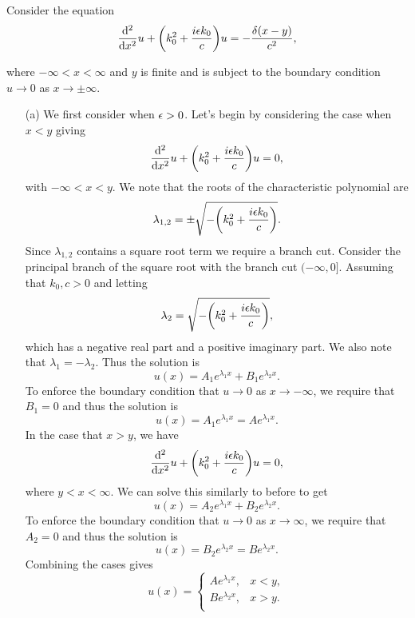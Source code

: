 \documentclass[12pt]{report}
\begin{document}
\begin{solution}

    \noindent
    Consider the equation
    \begin{equation}\label{3}
        \frac{\mathrm{d}^{2} }{\mathrm{d} x^{2}}u + {\left(k_0^2 + \frac{i{\epsilon} k_0}{c}\right)}u = -\frac{\delta(x -y)}{c^2},
    \end{equation}
    
    where $-\infty < x < \infty$ and $y$ is finite and is subject to the boundary condition $u \to 0$ as $x \to \pm \infty$.

    \begin{enumerate}
        \item [(a)]
        We first consider  when ${\epsilon} > 0$. Let's begin by considering the case when $x < y$ giving 
        \[
            \frac{\mathrm{d}^{2} }{\mathrm{d} x^{2}}u + {\left(k_0^2 + \frac{i{\epsilon} k_0}{c}\right)}u = 0,
        \]      
        with $-\infty < x < y$. We note that the roots of the characteristic polynomial are
        \[
            \lambda_{1,2} = \pm \sqrt{-{\left(k_0^2 + \frac{i {\epsilon} k_0}{c}\right)}}.
        \]
        Since $\lambda_{1,2}$ contains a square root term we require a branch cut. Consider the principal branch of the square root with the branch cut $(-\infty,0]$.
        Assuming that $k_0, c> 0$ and letting
        \[
            \lambda_2 = \sqrt{-{\left(k_0^2 + \frac{i {\epsilon} k_0}{c}\right)}},
        \]
        which has a negative real part and a positive imaginary part. We also note that $\lambda_1 = -\lambda_2$. Thus the solution is
        \[
            u(x) = A_1 e^{\lambda_1 x} + B_1 e^{\lambda_2 x}.
        \] 
        To enforce the boundary condition that $u \to 0$ as $x \to -\infty$, we require that $B_1 = 0$ and thus the solution is
        \[
            u(x) = A_1 e^{\lambda_1 x} = A e^{\lambda_1 x}.
        \]
        In the case that $x > y$, we have 
        \[
            \frac{\mathrm{d}^{2} }{\mathrm{d} x^{2}}u + {\left(k_0^2 + \frac{i{\epsilon} k_0}{c}\right)}u = 0,
        \]
        where $y < x < \infty$. We can solve this similarly to before to get
        \[
            u(x) = A_2 e^{\lambda_1 x} + B_2 e^{\lambda_2 x}.
        \] 
        To enforce the boundary condition that $u \to 0$ as $x \to \infty$, we require that $A_2 = 0$ and thus the solution is
        \[
            u(x) = B_2e^{\lambda_2 x} = Be^{\lambda_2 x}.
        \]
        Combining the cases gives 
        \begin{equation}\label{3-intso}
            u(x) = \begin{cases}
                A e^{\lambda_1 x}, & x<y,\\
                B e^{\lambda_2 x}, & x>y.\\
            \end{cases}
        \end{equation}
        

\end{enumerate}
\end{solution}
\end{document}

